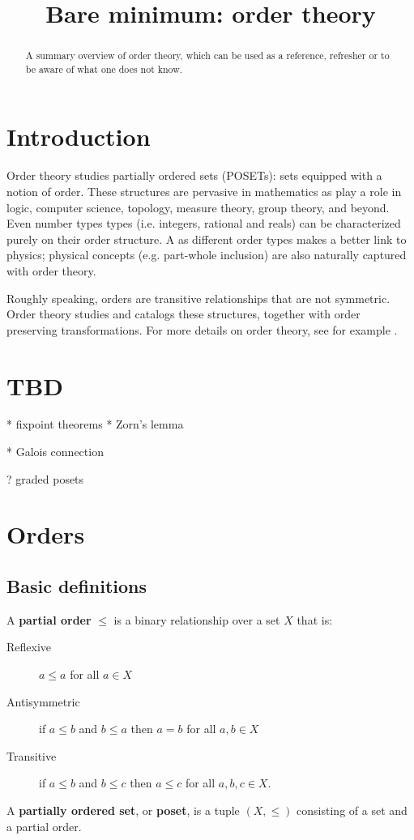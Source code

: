 \documentclass{article}
\title{Bare minimum: order theory}
\date{\vspace{-5ex}}
\newcommand{\marginleft}[1] {\reversemarginpar\marginpar{#1}}
\begin{document}
\maketitle


\begin{abstract}
A summary overview of order theory, which can be used as a reference, refresher or to be aware of what one does not know.
\end{abstract}

\section{Introduction}

Order theory studies partially ordered sets (POSETs): sets equipped with a notion of order. These structures are pervasive in mathematics as play a role in logic, computer science, topology, measure theory, group theory, and beyond. Even number types types (i.e. integers, rational and reals) can be characterized purely on their order structure. A as different order types makes a better link to physics; physical concepts (e.g. part-whole inclusion) are also naturally captured with order theory.

Roughly speaking, orders are transitive relationships that are not symmetric. Order theory studies and catalogs these structures, together with order preserving transformations. For more details on order theory, see for example \cite{davey2002introduction, pinter2014book}.

\section{TBD}

* fixpoint theorems
* Zorn's lemma

* Galois connection

? graded posets

\section{Orders}

\subsection{Basic definitions}

\begin{defn}
	A \textbf{partial order} \marginleft{Partial order, poset: $(X, \leq)$} $\leq$ is a binary relationship over a set $X$ that is:
	\begin{description}
		\item[Reflexive] $a \leq a$ for all $a \in X$
		\item[Antisymmetric] if $a \leq b$ and $b \leq a$ then $a = b$ for all $a, b \in X$
		\item[Transitive] if $a \leq b$ and $b \leq c$ then $a \leq c$ for all $a, b, c \in X$.
	\end{description}
	A \textbf{partially ordered set}, or \textbf{poset}, is a tuple $(X, \leq)$ consisting of a set and a partial order.
\end{defn}
\end{document}
